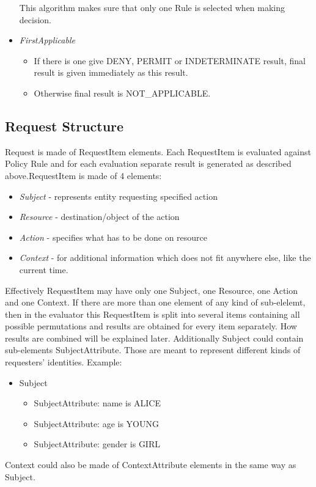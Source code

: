 \documentclass{book}
\begin{document}
\begin{itemize}
This algorithm makes sure that only one Rule is selected when making decision.

    \item  \emph{FirstApplicable}

    \begin{itemize}
        \item If there is one give DENY, PERMIT or INDETERMINATE result, final result is given immediately as this result.
        \item Otherwise final result is NOT\_APPLICABLE.
    \end{itemize}

\end{itemize}


\subsection{Request Structure} %
\label{subsec:request_structure}

Request is made of RequestItem elements. Each RequestItem is evaluated against Policy Rule and for each evaluation separate result is generated as described above.RequestItem is made of 4 elements:
    \begin{itemize}
        \item \emph{Subject} - represents entity requesting specified action
        \item \emph{Resource} - destination/object of the action
        \item \emph{Action} - specifies what has to be done on resource
        \item \emph{Context} - for additional information which does not fit anywhere else, like the current time.
    \end{itemize}

Effectively RequestItem may have only one Subject, one Resource, one Action and one Context. If there are more than one element of any kind of sub-elelemt, then in the evaluator this RequestItem is split into several items containing all possible permutations and results are obtained for every item separately. How results are combined will be explained later.
Additionally Subject could contain sub-elements SubjectAttribute. Those are meant to represent different kinds of requesters' identities. Example:

    \begin{itemize}
        \item Subject
        \begin{itemize}     
            \item SubjectAttribute: name is ALICE
            \item SubjectAttribute: age is YOUNG
            \item SubjectAttribute: gender is GIRL
        \end{itemize}
    \end{itemize}
Context could also be made of ContextAttribute elements in the same way as Subject.
\end{document}
